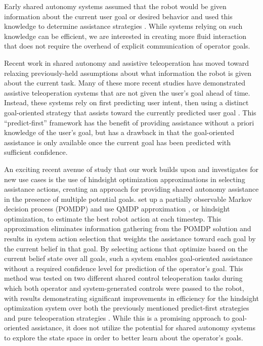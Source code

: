 \documentclass[conference]{IEEEtran}
\begin{document}
Early shared autonomy systems assumed that the robot would be given information about the current user goal or desired behavior and used this knowledge to determine assistance strategies \cite{aigner1997human, debus2001cooperative, goodrich2001experiments}. While systems relying on such knowledge can be efficient, we are interested in creating more fluid interaction that does not require the overhead of explicit communication of operator goals.

Recent work in shared autonomy and assistive teleoperation has moved toward relaxing previously-held assumptions about what information the robot is given about the current task. Many of these more recent studies have demonstrated assistive teleoperation systems that are not given the user's goal ahead of time. Instead, these systems rely on first predicting user intent, then using a distinct goal-oriented strategy that assists toward the currently predicted user goal \cite{dragan2012formalizing, fagg2004extracting, kragic2005human, schultz2017goal, yu2005telemanipulation}. This ``predict-first'' framework has the benefit of providing assistance without a priori knowledge of the user's goal, but has a drawback in that the goal-oriented assistance is only available once the current goal has been predicted with sufficient confidence.

An exciting recent avenue of study that our work builds upon and investigates for new use cases is the use of hindsight optimization approximations in selecting assistance actions, creating an approach for providing shared autonomy assistance in the presence of multiple potential goals. \citet{javdani2015shared} set up a partially observable Markov decision process (POMDP) and use QMDP approximation \cite{littman1995learning}, or hindsight optimization, to estimate the best robot action at each timestep. This approximation eliminates information gathering from the POMDP solution and results in system action selection that weights the assistance toward each goal by the current belief in that goal. By selecting actions that optimize based on the current belief state over all goals, such a system enables goal-oriented assistance without a required confidence level for prediction of the operator's goal. This method was tested on two different shared control teleoperation tasks during which both operator and system-generated controls were passed to the robot, with results demonstrating significant improvements in efficiency for the hindsight optimization system over both the previously mentioned predict-first strategies and pure teleoperation strategies \cite{javdani2018shared}. While this is a promising approach to goal-oriented assistance, it does not utilize the potential for shared autonomy systems to explore the state space in order to better learn about the operator's goals.
\end{document}
